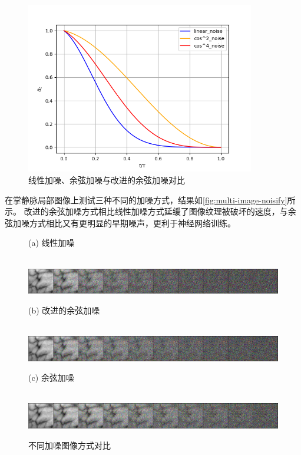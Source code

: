 \begin{figure}[!htbp]
    \centering
    \includegraphics[width=10cm]{image/chap03/contrast3.png}
    \caption{线性加噪、余弦加噪与改进的余弦加噪对比}
    \label{fig:contrast3}
\end{figure}
在掌静脉局部图像上测试三种不同的加噪方式，结果如\autoref{fig:multi-image-noisify}所示。
改进的余弦加噪方式相比线性加噪方式延缓了图像纹理被破坏的速度，与余弦加噪方式相比又有更明显的早期噪声，更利于神经网络训练。

\begin{figure}[h!]
    \centering
    \parbox{10cm}{\centering (a) 线性加噪} \\  %
    \includegraphics[scale = 0.15]{image/chap03/linear_noise.jpg} \\
    \parbox{10cm}{\centering (b) 改进的余弦加噪} \\  %
    \includegraphics[scale = 0.15]{image/chap03/cos^4_noise.jpg} \\
    \parbox{10cm}{\centering (c) 余弦加噪} \\  %
    \includegraphics[scale = 0.15]{image/chap03/cos^2_noise.jpg}
    
    \caption{不同加噪图像方式对比}
    \label{fig:multi-image-noisify}
\end{figure}
